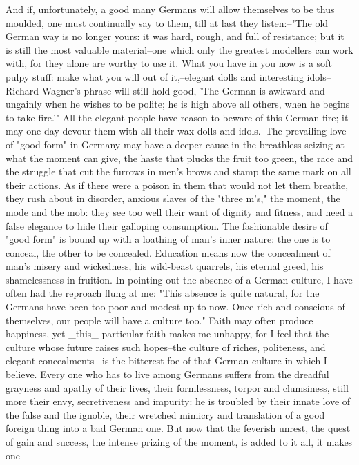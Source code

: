 And if, unfortunately, a good many Germans will allow themselves to
be thus moulded, one must continually say to them, till at last they
listen:--"The old German way is no longer yours: it was hard, rough,
and full of resistance; but it is still the most valuable
material--one which only the greatest modellers can work with, for
they alone are worthy to use it. What you have in you now is a soft
pulpy stuff: make what you will out of it,--elegant dolls and
interesting idols--Richard Wagner's phrase will still hold good, 'The
German is awkward and ungainly when he wishes to be polite; he is
high above all others, when he begins to take fire.'" All the elegant
people have reason to beware of this German fire; it may one day
devour them with all their wax dolls and idols.--The prevailing love
of "good form" in Germany may have a deeper cause in the breathless
seizing at what the moment can give, the haste that plucks the fruit
too green, the race and the struggle that cut the furrows in men's
brows and stamp the same mark on all their actions. As if there were
a poison in them that would not let them breathe, they rush about in
disorder, anxious slaves of the "three m's," the moment, the mode and
the mob: they see too well their want of dignity and fitness, and
need a false elegance to hide their galloping consumption. The
fashionable desire of "good form" is bound up with a loathing of
man's inner nature: the one is to conceal, the other to be concealed.
Education means now the concealment of man's misery and wickedness,
his wild-beast quarrels, his eternal greed, his shamelessness in
fruition. In pointing out the absence of a German culture, I have
often had the reproach flung at me: "This absence is quite natural,
for the Germans have been too poor and modest up to now. Once rich
and conscious of themselves, our people will have a culture too."
Faith may often produce happiness, yet _this_ particular faith makes
me unhappy, for I feel that the culture whose future raises such
hopes--the culture of riches, politeness, and elegant concealments--
is the bitterest foe of that German culture in which I believe. Every
one who has to live among Germans suffers from the dreadful grayness
and apathy of their lives, their formlessness, torpor and clumsiness,
still more their envy, secretiveness and impurity: he is troubled by
their innate love of the false and the ignoble, their wretched
mimicry and translation of a good foreign thing into a bad German
one. But now that the feverish unrest, the quest of gain and success,
the intense prizing of the moment, is added to it all, it makes one
